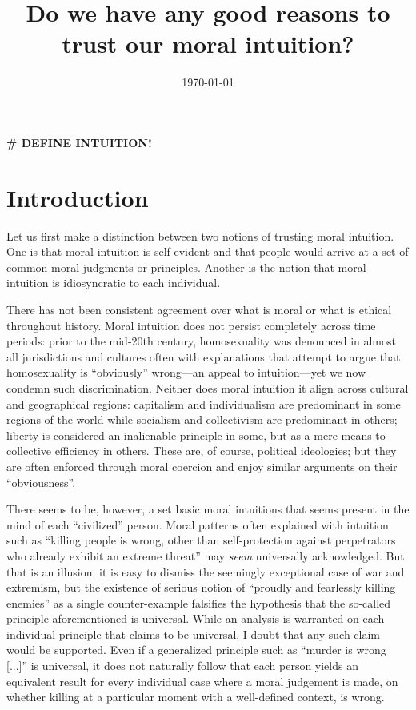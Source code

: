 \documentclass{scrartcl}
\title{Do we have any good reasons to trust our moral intuition?}
\author{\today}
\date{}
\begin{document}
\maketitle


{\bfseries\Huge\# DEFINE INTUITION!}

\section{Introduction}

Let us first make a distinction between two notions of trusting moral intuition. One is that moral intuition is self-evident and that people would arrive at a set of common moral judgments or principles. Another is the notion that moral intuition is idiosyncratic to each individual.

There has not been consistent agreement over what is moral or what is ethical throughout history. Moral intuition does not persist completely across time periods: prior to the mid-20th century, homosexuality was denounced in almost all jurisdictions and cultures often with explanations that attempt to argue that homosexuality is ``obviously'' wrong---an appeal to intuition---yet we now condemn such discrimination. Neither does moral intuition it align across cultural and geographical regions: capitalism and individualism are predominant in some regions of the world while socialism and collectivism are predominant in others; liberty is considered an inalienable principle in some, but as a mere means to collective efficiency in others. These are, of course, political ideologies; but they are often enforced through moral coercion and enjoy similar arguments on their ``obviousness''.

There seems to be, however, a set basic moral intuitions that seems present in the mind of each ``civilized'' person. Moral patterns often explained with intuition such as ``killing people is wrong, other than self-protection against perpetrators who already exhibit an extreme threat'' may \emph{seem} universally acknowledged. But that is an illusion: it is easy to dismiss the seemingly exceptional case of war and extremism, but the existence of serious notion of ``proudly and fearlessly killing enemies'' as a single counter-example falsifies the hypothesis that the so-called principle aforementioned is universal. While an analysis is warranted on each individual principle that claims to be universal, I doubt that any such claim would be supported.%
Even if a generalized principle such as ``murder is wrong [...]'' is universal, it does not naturally follow that each person yields an equivalent result for every individual case where a moral judgement is made, on whether killing at a particular moment with a well-defined context, is wrong.
\end{document}
